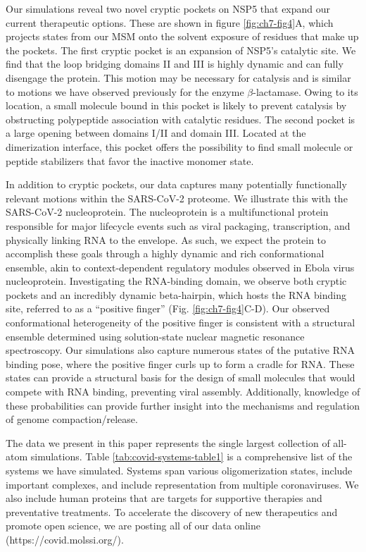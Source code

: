 \documentclass[../main.tex]{subfiles}
\begin{document}
        Our simulations reveal two novel cryptic pockets on NSP5 that expand our current therapeutic options. These are shown in figure \ref{fig:ch7-fig4}A, which projects states from our MSM onto the solvent exposure of residues that make up the pockets. The first cryptic pocket is an expansion of NSP5’s catalytic site. We find that the loop bridging domains II and III is highly dynamic and can fully disengage the protein. This motion may be necessary for catalysis and is similar to motions we have observed previously for the enzyme $\beta$-lactamase\cite{Porter:2019hv}. Owing to its location, a small molecule bound in this pocket is likely to prevent catalysis by obstructing polypeptide association with catalytic residues. The second pocket is a large opening between domains I/II and domain III. Located at the dimerization interface, this pocket offers the possibility to find small molecule or peptide stabilizers that favor the inactive monomer state.

        In addition to cryptic pockets, our data captures many potentially functionally relevant motions within the SARS-CoV-2 proteome. We illustrate this with the SARS-CoV-2 nucleoprotein. The nucleoprotein is a multifunctional protein responsible for major lifecycle events such as viral packaging, transcription, and physically linking RNA to the envelope\cite{mcbride_coronavirus_2014,masters_coronavirus_2019}. As such, we expect the protein to accomplish these goals through a highly dynamic and rich conformational ensemble, akin to context-dependent regulatory modules observed in Ebola virus nucleoprotein\cite{cubuk_sars-cov-2_2020,su_electron_2018}. Investigating the RNA-binding domain, we observe both cryptic pockets and an incredibly dynamic beta-hairpin, which hosts the RNA binding site, referred to as a “positive finger” (Fig. \ref{fig:ch7-fig4}C-D). Our observed conformational heterogeneity of the positive finger is consistent with a structural ensemble determined using solution-state nuclear magnetic resonance spectroscopy\cite{dinesh_structural_2020}. Our simulations also capture numerous states of the putative RNA binding pose, where the positive finger curls up to form a cradle for RNA. These states can provide a structural basis for the design of small molecules that would compete with RNA binding, preventing viral assembly. Additionally, knowledge of these probabilities can provide further insight into the mechanisms and regulation of genome compaction/release.

        The data we present in this paper represents the single largest collection of all-atom simulations. Table \ref{tab:covid-systems-table1} is a comprehensive list of the systems we have simulated. Systems span various oligomerization states, include important complexes, and include representation from multiple coronaviruses. We also include human proteins that are targets for supportive therapies and preventative treatments. To accelerate the discovery of new therapeutics and promote open science, we are posting all of our data online (https://covid.molssi.org/).
\end{document}
